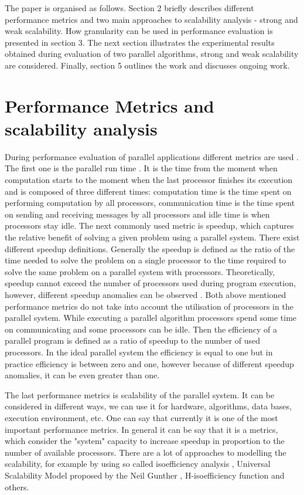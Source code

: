 \documentclass[runningheads]{llncs}
\begin{document}
The paper is organised as follows. Section 2 briefly describes
different performance metrics and two main approaches to scalability analysis - strong and weak scalability. How  granularity can be used in performance evaluation is presented in section 3. The next section illustrates the experimental results obtained during evaluation of two parallel algorithms, strong and weak scalability are considered. Finally, section 5 outlines the work and discusses ongoing work. 

\section{Performance Metrics and scalability analysis}

During performance evaluation of parallel applications different metrics are used \cite{grama}. The first one is the parallel run time . It is the time from the moment when computation starts to
the moment when the last processor finishes its execution and is composed of three different times: computation time  is the time spent on performing computation by all processors, communication time  is the time spent on sending and receiving messages by all processors and idle time  is when processors stay idle. The next commonly used metric is speedup, which captures the relative benefit of solving a given problem using a parallel system. There exist different speedup definitions. Generally the speedup  is defined as the ratio of the time needed to solve the problem on a single processor to the time required to solve the same problem on a parallel system with  processors. Theoretically, speedup
cannot exceed the number of processors used during program execution, however, different speedup anomalies can be observed \cite{kwiatkowski_1}. Both above mentioned performance metrics do not take into account the utilisation of processors in the parallel system. While executing a parallel algorithm processors spend some time on communicating and some processors can be idle. Then the efficiency  of a parallel program is defined as a ratio of speedup to the number of used processors. In the ideal parallel system the efficiency
is equal to one but in practice efficiency is between zero and
one, however because of different speedup anomalies, it can be even 
greater than one. 

The last performance metrics is scalability of the parallel system. It can be considered in different ways, we can  use it for hardware, algorithms, data bases, execution environment, etc.  One can say that currently it is one of the most important performance metrics. In general it can be say that it is a metrics, which consider the "system" capacity to increase speedup in proportion to the number of available processors. There are a lot of approaches to modelling the scalability, for example by using so called isoefficiency analysis \cite{grama}, Universal Scalability Model proposed by the Neil Gunther \cite{gunther}, H-isoefficiency function \cite{bosque} and others. 
\end{document}
